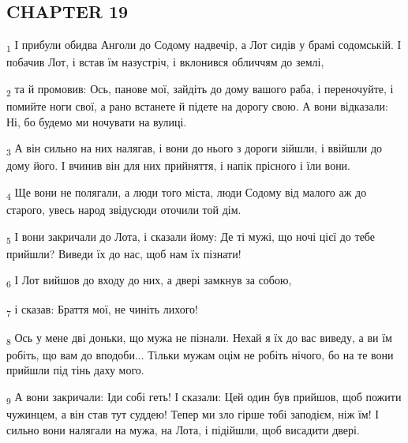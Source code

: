 \subsection{CHAPTER 19}
\begin{tcolorbox}
\textsubscript{1} І прибули обидва Анголи до Содому надвечір, а Лот сидів у брамі содомській. І побачив Лот, і встав їм назустріч, і вклонився обличчям до землі,
\end{tcolorbox}
\begin{tcolorbox}
\textsubscript{2} та й промовив: Ось, панове мої, зайдіть до дому вашого раба, і переночуйте, і помийте ноги свої, а рано встанете й підете на дорогу свою. А вони відказали: Ні, бо будемо ми ночувати на вулиці.
\end{tcolorbox}
\begin{tcolorbox}
\textsubscript{3} А він сильно на них налягав, і вони до нього з дороги зійшли, і ввійшли до дому його. І вчинив він для них прийняття, і напік прісного і їли вони.
\end{tcolorbox}
\begin{tcolorbox}
\textsubscript{4} Ще вони не полягали, а люди того міста, люди Содому від малого аж до старого, увесь народ звідусюди оточили той дім.
\end{tcolorbox}
\begin{tcolorbox}
\textsubscript{5} І вони закричали до Лота, і сказали йому: Де ті мужі, що ночі цієї до тебе прийшли? Виведи їх до нас, щоб нам їх пізнати!
\end{tcolorbox}
\begin{tcolorbox}
\textsubscript{6} І Лот вийшов до входу до них, а двері замкнув за собою,
\end{tcolorbox}
\begin{tcolorbox}
\textsubscript{7} і сказав: Браття мої, не чиніть лихого!
\end{tcolorbox}
\begin{tcolorbox}
\textsubscript{8} Ось у мене дві доньки, що мужа не пізнали. Нехай я їх до вас виведу, а ви їм робіть, що вам до вподоби... Тільки мужам оцім не робіть нічого, бо на те вони прийшли під тінь даху мого.
\end{tcolorbox}
\begin{tcolorbox}
\textsubscript{9} А вони закричали: Іди собі геть! І сказали: Цей один був прийшов, щоб пожити чужинцем, а він став тут суддею! Тепер ми зло гірше тобі заподієм, ніж їм! І сильно вони налягали на мужа, на Лота, і підійшли, щоб висадити двері.
\end{tcolorbox}
